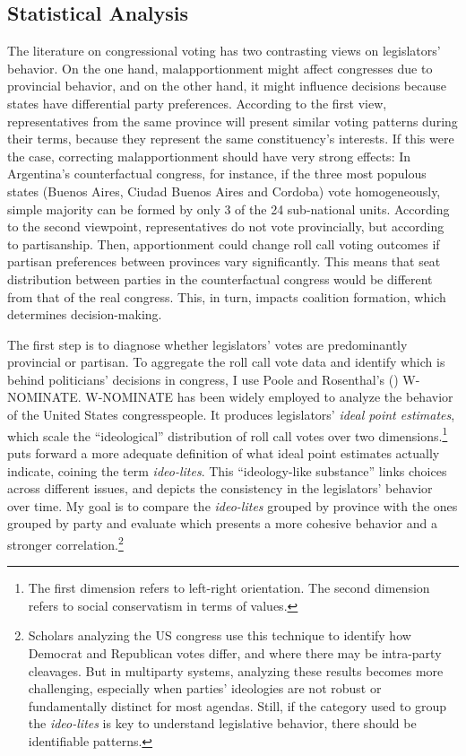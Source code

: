 \documentclass[a4paper,12pt]{article}
\begin{document}
\vspace{.5cm}

\subsection{Statistical Analysis}
\label{sub:stat}

The literature on congressional voting has two contrasting views on legislators' behavior. On the one hand, malapportionment might affect congresses due to provincial behavior, and on the other hand, it might influence decisions because states have differential party preferences. According to the first view, representatives from the same province will present similar voting patterns during their terms, because they represent the same constituency's interests. If this were the case, correcting malapportionment should have very strong effects: In Argentina's counterfactual congress, for instance, if the three most populous states (Buenos Aires, Ciudad Buenos Aires and Cordoba) vote homogeneously, simple majority can be formed by only 3 of the 24 sub-national units. According to the second viewpoint, representatives do not vote provincially, but according to partisanship. Then, apportionment could change roll call voting outcomes if partisan preferences between provinces vary significantly. This means that seat distribution between parties in the counterfactual congress would be different from that of the real congress. This, in turn, impacts coalition formation, which determines decision-making.

The first step is to diagnose whether legislators' votes are predominantly provincial or partisan. To aggregate the roll call vote data and identify which is behind politicians' decisions in congress, I use Poole and Rosenthal's (\citeyear{poole2011ideology}) W-NOMINATE. W-NOMINATE has been widely employed to analyze the behavior of the United States congresspeople. It produces legislators' \textit{ideal point estimates}, which scale the ``ideological'' distribution of roll call votes over two dimensions.\footnote{The first dimension refers to left-right orientation. The second dimension refers to social conservatism in terms of values.} \citet{mccarty2016defense} puts forward a more adequate definition of what ideal point estimates actually indicate, coining the term \textit{ideo-lites}. This ``ideology-like substance'' links choices across different issues, and depicts the consistency in the legislators' behavior over time. My goal is to compare the \textit{ideo-lites} grouped by province with the ones grouped by party and evaluate which presents a more cohesive behavior and a stronger correlation.\footnote{Scholars analyzing the US congress use this technique to identify how Democrat and Republican votes differ, and where there may be intra-party cleavages. But in multiparty systems, analyzing these results becomes more challenging, especially when parties' ideologies are not robust or fundamentally distinct for most agendas. Still, if the category used to group the \textit{ideo-lites} is key to understand legislative behavior, there should be identifiable patterns.}
\end{document}
